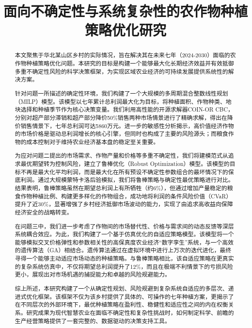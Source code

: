 \documentclass[withoutpreface,bwprint]{cumcmthesis} %
\title{面向不确定性与系统复杂性的农作物种植策略优化研究
}
\begin{document}
\maketitle
\begin{abstract}

本文聚焦于华北某山区乡村的实际情况，旨在解决其在未来七年（2024-2030）面临的农作物种植策略优化问题。本研究的目标是构建一个能够最大化长期经济效益并有效抵御多重不确定性风险的科学决策框架，为实现区域农业经济的可持续发展提供系统性的解决方案。

针对问题一所描述的确定性环境，我们构建了一个大规模的多周期混合整数线性规划（MILP）模型。该模型以七年累计总利润最大化为目标，将种植面积、作物种类、地块选择和种植季节作为核心决策变量。我们利用高性能的开源求解器COIN-OR CBC，分别对超产部分滞销和超产部分降价50\%销售两种市场情景进行了精确求解，得出在降价销售情景下，七年总利润可达5860万元。进一步的敏感性分析揭示，高价值经济作物的市场价格是驱动总利润增长的核心引擎，但同时也构成了主要的风险源头；而粮食作物的成本控制对于维持农业经济基本盘的稳定至关重要。

为应对问题二提出的市场需求、作物产量和价格等多重不确定性，我们将建模范式从追求最优期望转为控制风险，建立了鲁棒优化（Robust Optimization）模型。该模型的目标不再是最大化平均利润，而是最大化在所有预设不确定性参数组合的最坏情况下的保底利润。通过大规模蒙特卡洛后验模拟，我们将鲁棒策略与确定性最优策略进行对比。结果表明，鲁棒策略虽然在期望总利润上有所牺牲（约6\%），但通过增加产量稳定的粮食作物种植比例、构建更多样化的作物组合，成功地将利润的条件风险价值（CVaR）提升了近30\%，显著增强了乡村经济抵御市场波动的能力，实现了由追求高收益向保障经济安全的战略转变。

在问题三中，我们进一步考虑了作物间的市场替代性、价格与需求间的动态反馈等深层系统耦合效应。为此，我们构建了一个基于仿真优化的自适应策略模型。该模型将一个能够模拟交叉价格弹性和参数相关性的高保真度农业经济“数字孪生”系统，与一个高效的遗传算法（GA）相结合。遗传算法通过在虚拟环境中进行上万次的迭代进化，最终寻得一个能够主动适应市场动态的种植策略。与鲁棒策略相比，该自适应策略在更真实的复杂系统仿真中，不仅将期望总利润提升了12\%，而且在极端不利情景下的亏损风险更小，展现出对市场机遇的捕捉能力和卓越的风险规避能力。

综上所述，本研究构建了一个从确定性规划、风险规避到复杂系统自适应的多层次、递进式优化框架。该框架不仅为该乡村提供了具体的、可操作的七年种植方案，更揭示了在不同层次的外部环境下，最优种植策略在盈利性、稳健性和适应性之间的内在权衡关系。研究成果为现代智慧农业在面临不确定性和复杂性挑战时，如何制定科学、前瞻的生产经营策略提供了一套完整的、数据驱动的决策支持工具。


\end{abstract}
\end{document}
